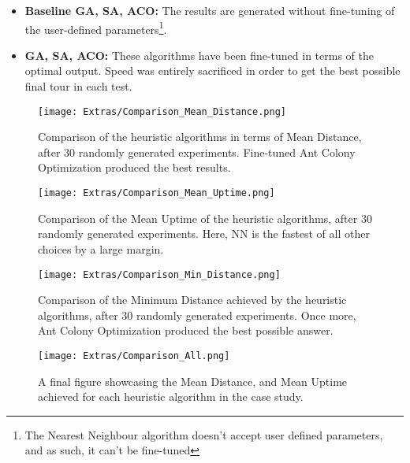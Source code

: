 \begin{itemize}
	\item \textbf{Baseline GA, SA, ACO:} The results are generated without fine-tuning of the user-defined parameters\footnote{The Nearest Neighbour algorithm doesn't accept user defined parameters, and as such, it can't be fine-tuned}.
	\item \textbf{GA, SA, ACO:} These algorithms have been fine-tuned in terms of the optimal output. Speed was entirely sacrificed in order to get the best possible final tour in each test.
\end{itemize}

\begin{figure}[htbp]
	\centering
	\texttt{[image: Extras/Comparison\_Mean\_Distance.png]}
	\caption{Comparison of the heuristic algorithms in terms of Mean Distance, after 30 randomly generated experiments. Fine-tuned Ant Colony Optimization produced the best results.}
	\label{fig: mean_distance}
\end{figure}

\begin{figure}[htbp]
	\centering
	\texttt{[image: Extras/Comparison\_Mean\_Uptime.png]}
	\caption{Comparison of the Mean Uptime of the heuristic algorithms, after 30 randomly generated experiments. Here, NN is the fastest of all other choices by a large margin.}
	\label{fig: mean_uptime}
\end{figure}

\begin{figure}[htbp]
	\centering
	\texttt{[image: Extras/Comparison\_Min\_Distance.png]}
	\caption{Comparison of the Minimum Distance achieved by the heuristic algorithms, after 30 randomly generated experiments. Once more, Ant Colony Optimization produced the best possible answer.}
	\label{fig: min_distance}
\end{figure}

\begin{figure}[h]
	\centering
	\texttt{[image: Extras/Comparison\_All.png]}
	\caption{A final figure showcasing the Mean Distance, and Mean Uptime achieved for each heuristic algorithm in the case study.}
	\label{fig: compare_all}
\end{figure}
